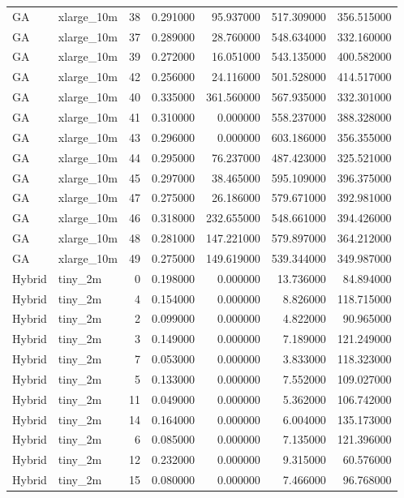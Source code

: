\begin{tabular}{llrrrrr}
GA & xlarge_10m & 38 & 0.291000 & 95.937000 & 517.309000 & 356.515000 \\
GA & xlarge_10m & 37 & 0.289000 & 28.760000 & 548.634000 & 332.160000 \\
GA & xlarge_10m & 39 & 0.272000 & 16.051000 & 543.135000 & 400.582000 \\
GA & xlarge_10m & 42 & 0.256000 & 24.116000 & 501.528000 & 414.517000 \\
GA & xlarge_10m & 40 & 0.335000 & 361.560000 & 567.935000 & 332.301000 \\
GA & xlarge_10m & 41 & 0.310000 & 0.000000 & 558.237000 & 388.328000 \\
GA & xlarge_10m & 43 & 0.296000 & 0.000000 & 603.186000 & 356.355000 \\
GA & xlarge_10m & 44 & 0.295000 & 76.237000 & 487.423000 & 325.521000 \\
GA & xlarge_10m & 45 & 0.297000 & 38.465000 & 595.109000 & 396.375000 \\
GA & xlarge_10m & 47 & 0.275000 & 26.186000 & 579.671000 & 392.981000 \\
GA & xlarge_10m & 46 & 0.318000 & 232.655000 & 548.661000 & 394.426000 \\
GA & xlarge_10m & 48 & 0.281000 & 147.221000 & 579.897000 & 364.212000 \\
GA & xlarge_10m & 49 & 0.275000 & 149.619000 & 539.344000 & 349.987000 \\
Hybrid & tiny_2m & 0 & 0.198000 & 0.000000 & 13.736000 & 84.894000 \\
Hybrid & tiny_2m & 4 & 0.154000 & 0.000000 & 8.826000 & 118.715000 \\
Hybrid & tiny_2m & 2 & 0.099000 & 0.000000 & 4.822000 & 90.965000 \\
Hybrid & tiny_2m & 3 & 0.149000 & 0.000000 & 7.189000 & 121.249000 \\
Hybrid & tiny_2m & 7 & 0.053000 & 0.000000 & 3.833000 & 118.323000 \\
Hybrid & tiny_2m & 5 & 0.133000 & 0.000000 & 7.552000 & 109.027000 \\
Hybrid & tiny_2m & 11 & 0.049000 & 0.000000 & 5.362000 & 106.742000 \\
Hybrid & tiny_2m & 14 & 0.164000 & 0.000000 & 6.004000 & 135.173000 \\
Hybrid & tiny_2m & 6 & 0.085000 & 0.000000 & 7.135000 & 121.396000 \\
Hybrid & tiny_2m & 12 & 0.232000 & 0.000000 & 9.315000 & 60.576000 \\
Hybrid & tiny_2m & 15 & 0.080000 & 0.000000 & 7.466000 & 96.768000 \\

\end{tabular}
